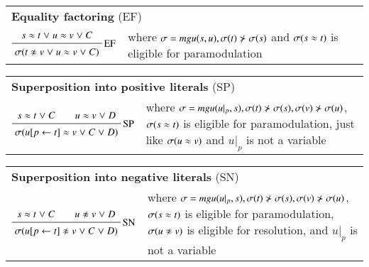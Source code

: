 \medskip

\begin{tabular}{m{}m{}}
    \multicolumn{2}{l}{{\bf Equality factoring} (EF)} \\[\jot]
    $\namedinference{EF}{s \eq t \llor u \eq v \llor C}{\sigmacl{t \noteq v \llor u \eq v \llor C}}$ 
        & where $\sigma = \mathit{mgu}(s,u), \sigma(t) \not\succ \sigma(s)$ and 
        $\sigma(s \approx t)$ is eligible for paramodulation
\end{tabular}

\medskip

\begin{tabular}{m{}m{}}
    \multicolumn{2}{l}{{\bf Superposition into positive literals} (SP)} \\[\jot]
    $\namedinference{SP}{s \eq t \llor C \qquad u \eq v \llor D}{\sigmacl{u[p \leftarrow t] \eq v \llor C \llor D}}$ 
        & where $\sigma = \mathit{mgu}(u|_p, s), \sigma(t) \not\succ \sigma(s), \sigma(v) \not\succ \sigma(u)$,
        $\sigma(s \approx t)$ is eligible for paramodulation, just like $\sigma(u \approx v)$ and $u|_p$ is not a variable
\end{tabular}

\medskip

\begin{tabular}{m{}m{}}
    \multicolumn{2}{l}{{\bf Superposition into negative literals} (SN)} \\[\jot]
    $\namedinference{SN}{s \eq t \llor C \qquad u \noteq v \llor D}{\sigmacl{u[p \leftarrow t] \noteq v \llor C \llor D}}$ 
        & where $\sigma = \mathit{mgu}(u|_p, s), \sigma(t) \not\succ \sigma(s), \sigma(v) \not\succ \sigma(u)$,
         $\sigma(s \approx t)$ is eligible for paramodulation, $\sigmacl{u \noteq v}$ is eligible for resolution, and $u|_p$ is not a variable
\end{tabular}




